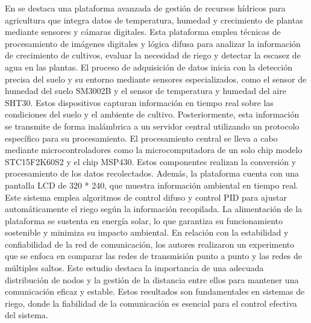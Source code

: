 \bigbreak
En \cite{haiyan_intelligent_2022} se destaca una plataforma avanzada de gestión de recursos hídricos para agricultura que integra datos de temperatura, humedad y crecimiento de plantas mediante sensores y cámaras digitales. Esta plataforma emplea técnicas de procesamiento de imágenes digitales y lógica difusa para analizar la información de crecimiento de cultivos, evaluar la necesidad de riego y detectar la escasez de agua en las plantas. El proceso de adquisición de datos inicia con la detección precisa del suelo y su entorno mediante sensores especializados, como el sensor de humedad del suelo SM3002B y el sensor de temperatura y humedad del aire SHT30. Estos dispositivos capturan información en tiempo real sobre las condiciones del suelo y el ambiente de cultivo. Posteriormente, esta información se transmite de forma inalámbrica a un servidor central utilizando un protocolo específico para su procesamiento. El procesamiento central se lleva a cabo mediante microcontroladores como la microcomputadora de un solo chip modelo STC15F2K60S2 y el chip MSP430. Estos componentes realizan la conversión y procesamiento de los datos recolectados. Además, la plataforma cuenta con una pantalla LCD de 320 * 240, que muestra información ambiental en tiempo real. Este sistema emplea algoritmos de control difuso y control PID para ajustar automáticamente el riego según la información recopilada. La alimentación de la plataforma se sustenta en energía solar, lo que garantiza su funcionamiento sostenible y minimiza su impacto ambiental. En relación con la estabilidad y confiabilidad de la red de comunicación, los autores realizaron un experimento que se enfoca en comparar las redes de transmisión punto a punto y las redes de múltiples saltos. Este estudio destaca la importancia de una adecuada distribución de nodos y la gestión de la distancia entre ellos para mantener una comunicación eficaz y estable. Estos resultados son fundamentales en sistemas de riego, donde la fiabilidad de la comunicación es esencial para el control efectiva del sistema.

